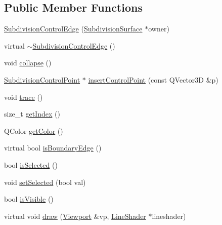 \subsection*{Public Member Functions}
\begin{DoxyCompactItemize}
\item 
\hyperlink{classShipCADGeometry_1_1SubdivisionControlEdge_aca48edfc1bb45a645708aecc8c8c3e04}{Subdivision\-Control\-Edge} (\hyperlink{classShipCADGeometry_1_1SubdivisionSurface}{Subdivision\-Surface} $\ast$owner)
\item 
virtual \hyperlink{classShipCADGeometry_1_1SubdivisionControlEdge_ad5e8153693c900a598618277cdeccd15}{$\sim$\-Subdivision\-Control\-Edge} ()
\item 
void \hyperlink{classShipCADGeometry_1_1SubdivisionControlEdge_a33fffac08b512f73c0676a5cfa81511d}{collapse} ()
\item 
\hyperlink{classShipCADGeometry_1_1SubdivisionControlPoint}{Subdivision\-Control\-Point} $\ast$ \hyperlink{classShipCADGeometry_1_1SubdivisionControlEdge_a4839a04d67e4240b570fd23be711bc10}{insert\-Control\-Point} (const Q\-Vector3\-D \&p)
\item 
void \hyperlink{classShipCADGeometry_1_1SubdivisionControlEdge_a07c67ddff486dc5e4ad830f549b32099}{trace} ()
\item 
size\-\_\-t \hyperlink{classShipCADGeometry_1_1SubdivisionControlEdge_a0fb224ed7895deb9eb4cdb57ab9c451c}{get\-Index} ()
\item 
Q\-Color \hyperlink{classShipCADGeometry_1_1SubdivisionControlEdge_a5cafa9a1fd8c93f10e2ae767608dfb26}{get\-Color} ()
\item 
virtual bool \hyperlink{classShipCADGeometry_1_1SubdivisionControlEdge_a23adc8ad28860987b7b4866eada3c463}{is\-Boundary\-Edge} ()
\item 
bool \hyperlink{classShipCADGeometry_1_1SubdivisionControlEdge_abcb240992ffb5637363341dbfd7003c7}{is\-Selected} ()
\item 
void \hyperlink{classShipCADGeometry_1_1SubdivisionControlEdge_ae247e08eec97952d1835df03c8269829}{set\-Selected} (bool val)
\item 
bool \hyperlink{classShipCADGeometry_1_1SubdivisionControlEdge_aaf83103b6772bf2387641b09194b12a6}{is\-Visible} ()
\item 
virtual void \hyperlink{classShipCADGeometry_1_1SubdivisionControlEdge_a6b86017a5ea7fe487f6017071406e8c4}{draw} (\hyperlink{classShipCADGeometry_1_1Viewport}{Viewport} \&vp, \hyperlink{classShipCADGeometry_1_1LineShader}{Line\-Shader} $\ast$lineshader)

\end{DoxyCompactItemize}
